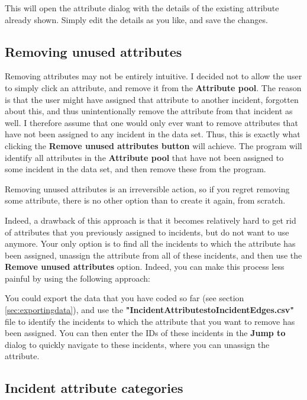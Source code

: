 \documentclass{memoir}
\begin{document}
This will open the attribute dialog with the details of the existing attribute already shown. Simply edit the details as you like, and save the changes.

\subsection{Removing unused attributes}
\label{sec:removingattributes}

Removing attributes may not be entirely intuitive. I decided not to allow the user to simply click an attribute, and remove it from the \textbf{Attribute pool}. The reason is that the user might have assigned that attribute to another incident, forgotten about this, and thus unintentionally remove the attribute from that incident as well. I therefore assume that one would only ever want to remove attributes that have not been assigned to any incident in the data set. Thus, this is exactly what clicking the \textbf{Remove unused attributes button} will achieve. The program will identify all attributes in the \textbf{Attribute pool} that have not been assigned to some incident in the data set, and then remove these from the program.

Removing unused attributes is an irreversible action, so if you regret removing some attribute, there is no other option than to create it again, from scratch.

Indeed, a drawback of this approach is that it becomes relatively hard to get rid of attributes that you previously assigned to incidents, but do not want to use anymore. Your only option is to find all the incidents to which the attribute has been assigned, unassign the attribute from all of these incidents, and then use the \textbf{Remove unused attributes} option. Indeed, you can make this process less painful by using the following approach:

You could export the data that you have coded so far (see section \ref{sec:exportingdata}), and use the \textbf{"Incident\textunderscore Attributes\textunderscore to\textunderscore Incident\textunderscore Edges.csv"} file to identify the incidents to which the attribute that you want to remove has been assigned. You can then enter the IDs of these incidents in the \textbf{Jump to} dialog to quickly navigate to these incidents, where you can unassign the attribute.


\subsection{Incident attribute categories}
\label{sec:incidentattributecategories}
\end{document}
